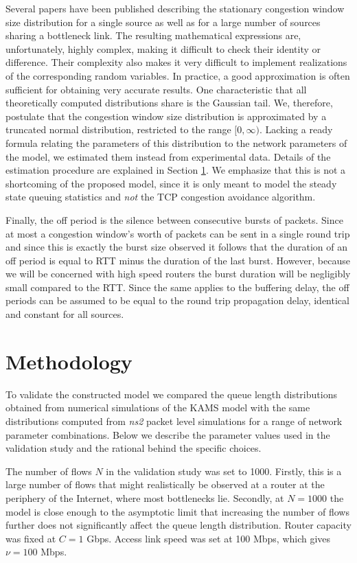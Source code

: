 \documentclass{IEEEtran}[10pt,letterpaper,conference]
\begin{document}
Several papers have been published describing the stationary congestion window size distribution for a single source as well as for a large number of sources sharing a bottleneck link. The resulting mathematical expressions are, unfortunately, highly complex, making it difficult to check their identity or difference. Their complexity also makes it very difficult to implement realizations of the corresponding random variables. In practice, a good approximation is often sufficient for obtaining very accurate results. One characteristic that all theoretically computed distributions share is the Gaussian tail. We, therefore, postulate that the congestion window size distribution is approximated by a truncated normal distribution, restricted to the range $[0,\infty)$. Lacking a ready formula relating the parameters of this distribution to the network parameters of the model, we estimated them instead from experimental data. Details of the estimation procedure are explained in Section \ref{methodology}. We emphasize that this is not a shortcoming of the proposed model, since it is only meant to model the steady state queuing statistics and \emph{not} the TCP congestion avoidance algorithm. 

Finally, the off period is the silence between consecutive bursts of packets. Since at most a congestion window's worth of packets can be sent in a single round trip and since this is exactly the burst size observed it follows that the duration of an off period is equal to RTT minus the duration of the last burst. However, because we will be concerned with high speed routers the burst duration will be negligibly small compared to the RTT. Since the same applies to the buffering delay, the off periods can be assumed to be equal to the round trip propagation delay, identical and constant for all sources.

\section{Methodology}
\label{methodology}
To validate the constructed model we compared the queue length distributions obtained from numerical simulations of the KAMS model with the same distributions computed from \emph{ns2} packet level simulations for a range of network parameter combinations. Below we describe the parameter values used in the validation study and the rational behind the specific choices.

The number of flows $N$ in the validation study was set to 1000. Firstly, this is a large number of flows that might realistically be observed at a router at the periphery of the Internet, where most bottlenecks lie. Secondly, at $N=1000$ the model is close enough to the asymptotic limit that increasing the number of flows further does not significantly affect the queue length distribution. Router capacity was fixed at $C=1$ Gbps. Access link speed was set at 100 Mbps, which gives $\nu=100$ Mbps.
\end{document}
